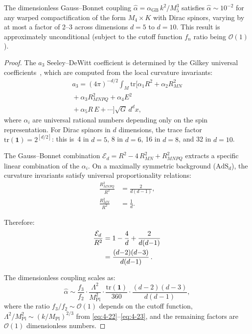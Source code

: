\begin{scalingrelation}\label{sr:4-1}
The dimensionless Gauss--Bonnet coupling $\hat{\alpha} = \alpha_{\mathrm{GB}}\, k^2 / M_5^3$ satisfies $\hat{\alpha} \sim 10^{-2}$ for any warped compactification of the form $M_4 \times K$ with Dirac spinors, varying by at most a factor of 2--3 across dimensions $d = 5$ to $d = 10$.  This result is approximately unconditional (subject to the cutoff function $f_n$ ratio being $\mathcal{O}(1)$).
\end{scalingrelation}

\begin{proof}
The $a_3$ Seeley--DeWitt coefficient is determined by the Gilkey universal coefficients~\cite{ch4:Gilkey1984,ch4:Gilkey1973}, which are computed from the local curvature invariants:
\begin{multline}
  a_3 = (4\pi)^{-d/2} \!\int_M \mathrm{tr}\bigl[\alpha_1 R^2 + \alpha_2 R_{MN}^2 \\
  {}+ \alpha_3 R_{MNPQ}^2 + \alpha_4 E^2 \\
  {}+ \alpha_5 R\, E + \cdots\bigr] \sqrt{G}\, d^d x,
  \label{eq:4-31}
\end{multline}
where $\alpha_i$ are universal rational numbers depending only on the spin representation. For Dirac spinors in $d$ dimensions, the trace factor $\mathrm{tr}(\mathbf{1}) = 2^{[d/2]}$: this is~4 in $d = 5$, 8 in $d = 6$, 16 in $d = 8$, and 32 in $d = 10$.

The Gauss--Bonnet combination $\mathcal{E}_d = R^2 - 4\, R_{MN}^2 + R_{MNPQ}^2$ extracts a specific linear combination of the $\alpha_i$. On a maximally symmetric background ($\mathrm{AdS}_d$), the curvature invariants satisfy universal proportionality relations:
\begin{subequations}\label{eq:4-32}
\begin{align}
  \frac{R_{MNPQ}^2}{R^2} &= \frac{2}{d(d-1)}, \label{eq:4-32a}\\
  \frac{R_{MN}^2}{R^2}   &= \frac{1}{d}. \label{eq:4-32b}
\end{align}
\end{subequations}

Therefore:
\begin{align}
  \frac{\mathcal{E}_d}{R^2}
  &= 1 - \frac{4}{d} + \frac{2}{d(d{-}1)} \notag\\
  &= \frac{(d{-}2)(d{-}3)}{d(d{-}1)}\,.
  \label{eq:4-33}
\end{align}

The dimensionless coupling scales as:
\begin{equation}
  \hat{\alpha} \sim \frac{f_3}{f_2} \cdot \frac{\Lambda^2}{M_{\mathrm{Pl}}^2}
               \cdot \frac{\mathrm{tr}(\mathbf{1})}{360}
               \cdot \frac{(d-2)(d-3)}{d(d-1)},
  \label{eq:4-34}
\end{equation}
where the ratio $f_3/f_2 \sim \mathcal{O}(1)$ depends on the cutoff function, $\Lambda^2/M_{\mathrm{Pl}}^2 \sim (k/M_{\mathrm{Pl}})^{2/3}$ from \eqref{eq:4-22}--\eqref{eq:4-23}, and the remaining factors are $\mathcal{O}(1)$ dimensionless numbers.


\end{proof}
